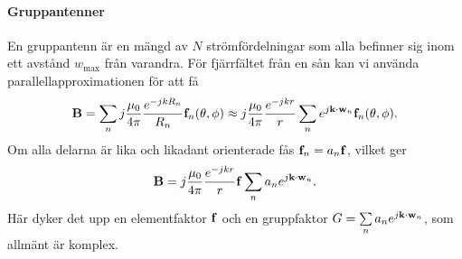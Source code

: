\paragraph{Gruppantenner}
En gruppantenn är en mängd av $N$ strömfördelningar som alla befinner sig inom ett avstånd $w_{\text{max}}$ från varandra. För fjärrfältet från en sån kan vi använda parallellapproximationen för att få
\begin{align*}
	\vb{B} = \sum\limits_{n}j\frac{\mu_{0}}{4\pi}\frac{e^{-jkR_{n}}}{R_{n}}\vb{f}_{n}(\theta, \phi) \approx j\frac{\mu_{0}}{4\pi}\frac{e^{-jkr}}{r}\sum\limits_{n}e^{j\vb{k}\cdot\vb{w}_{n}}\vb{f}_{n}(\theta, \phi).
\end{align*}
Om alla delarna är lika och likadant orienterade fås $\vb{f}_{n} = a_{n}\vb{f}$, vilket ger
\begin{align*}
	\vb{B} = j\frac{\mu_{0}}{4\pi}\frac{e^{-jkr}}{r}\vb{f}\sum\limits_{n}a_{n}e^{j\vb{k}\cdot\vb{w}_{n}}.
\end{align*}
Här dyker det upp en elementfaktor $\vb{f}$ och en gruppfaktor $G = \sum\limits_{n}a_{n}e^{j\vb{k}\cdot\vb{w}_{n}}$, som allmänt är komplex.